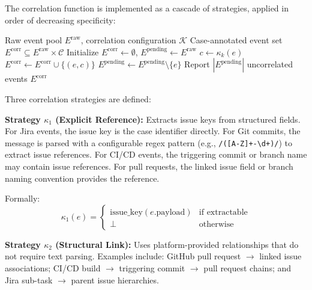 The correlation function is implemented as a cascade of strategies, applied 
in order of decreasing specificity:

\begin{algorithm}[htbp]
\caption{Case Correlation Cascade}
\label{alg:correlation}
\begin{algorithmic}[1]
\REQUIRE Raw event pool $E^{\text{raw}}$, correlation configuration $\mathcal{K}$
\ENSURE Case-annotated event set $E^{\text{corr}} \subseteq E^{\text{raw}} \times \mathcal{C}$
\STATE Initialize $E^{\text{corr}} \gets \emptyset$, $E^{\text{pending}} \gets E^{\text{raw}}$
        \STATE $c \gets \kappa_k(e)$
            \STATE $E^{\text{corr}} \gets E^{\text{corr}} \cup \{(e, c)\}$
            \STATE $E^{\text{pending}} \gets E^{\text{pending}} \setminus \{e\}$
        \ENDIF
    \ENDFOR
\ENDFOR
\STATE Report $|E^{\text{pending}}|$ uncorrelated events
\RETURN $E^{\text{corr}}$
\end{algorithmic}
\end{algorithm}

Three correlation strategies are defined:

\textbf{Strategy $\kappa_1$ (Explicit Reference):} Extracts issue keys from 
structured fields. For Jira events, the issue key is the case identifier 
directly. For Git commits, the message is parsed with a configurable regex 
pattern (e.g., \texttt{/([A-Z]+-\textbackslash d+)/}) to extract issue 
references. For CI/CD events, the triggering commit or branch name may 
contain issue references. For pull requests, the linked issue field or 
branch naming convention provides the reference.

Formally:
\begin{equation}
\label{eq:kappa1}
\kappa_1(e) = \begin{cases}
    \text{issue\_key}(e.\text{payload}) & \text{if extractable} \\
    \bot & \text{otherwise}
\end{cases}
\end{equation}

\textbf{Strategy $\kappa_2$ (Structural Link):} Uses platform-provided 
relationships that do not require text parsing. Examples include: GitHub 
pull request $\to$ linked issue associations; CI/CD build $\to$ triggering 
commit $\to$ pull request chains; and Jira sub-task $\to$ parent issue 
hierarchies.

